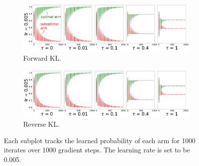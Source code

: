 \documentclass[\main/thesis.tex]{subfiles}
\begin{document}
  

\begin{figure}[!htb]
  \centering
  \begin{subfigure}[b]{1\linewidth}
    \centering
    \includegraphics[width=1\columnwidth]{figs/discrete-bandit/notlearnQ/rmsprop/prob_forward_optim=rmsprop_lr=0.005.png}
    \caption{Forward KL.}
    \label{fig:discrete-bandit-prob-forward-rmsprop}
  \end{subfigure}%
  
  \begin{subfigure}[b]{1\linewidth}
    \centering
    \includegraphics[width=1\columnwidth]{figs/discrete-bandit/notlearnQ/rmsprop/prob_reverse_optim=rmsprop_lr=0.005.png}
    \caption{Reverse KL. }
    \label{fig:discrete-bandit-prob-reverse-rmsprop}
  \end{subfigure}
  \caption{Each subplot tracks the learned probability of each arm for 1000 iterates over 1000 gradient steps. The learning rate is set to be 0.005. }
\end{figure}
\end{document}
